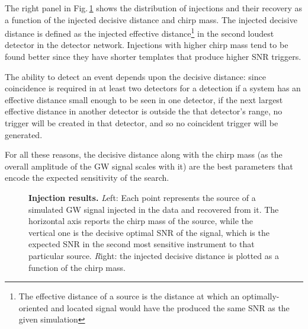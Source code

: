 \documentclass[binding=0.6cm, LaM]{sapthesis}
\begin{document}
        The right panel in Fig.\,\ref{fig:inj_plots} shows the distribution of injections and their recovery
        as a function of the injected decisive distance and chirp mass.
        The injected decisive distance is defined as the injected effective
        distance\footnote{The effective distance of a source is the distance at which an optimally-oriented and located signal would have the produced the same SNR as the given simulation }
        in the second loudest detector in the detector network.
	Injections with higher chirp mass tend to be found better 
	since they have shorter templates that produce higher SNR triggers. 

        The ability to detect an event depends upon the decisive distance:
        since coincidence is required in at least two detectors for a detection
        if a system has an effective distance small enough to be seen in one detector,
        if the next largest effective distance in another detector is outside the that detector’s range,
        no trigger will be created in that detector, and so no coincident trigger will be generated.

        For all these reasons, the decisive distance along with the chirp mass
        (as the overall amplitude of the GW signal scales with it)
        are the best parameters that encode the expected sensitivity of the search.

         \begin{figure}[t]
          \noindent
          \label{inj_plots}
          \centering
          \caption{{\bf Injection results.} {\textit Left:} Each point represents the source of a simulated GW signal injected in the data and recovered from it.  The horizontal axis reports the chirp mass of the source, while the vertical one is the decisive optimal SNR of the signal, which is the expected SNR in the second most sensitive instrument to that particular source. {\textit Right:} the injected decisive distance is plotted as a function of the chirp mass.}
          \label{fig:inj_plots}
        \end{figure}
\end{document}
